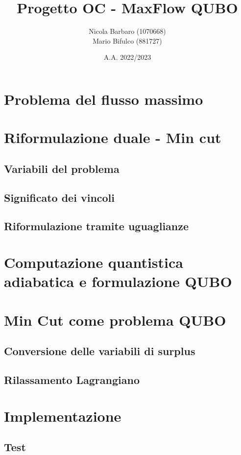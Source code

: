 \documentclass{article}
\author{Nicola Barbaro (1070668)\\Mario Bifulco (881727)}
\title{Progetto OC - MaxFlow QUBO}
\date{A.A. 2022/2023}
\begin{document}
\maketitle
\section{Problema del flusso massimo}
\section{Riformulazione duale - Min cut}
\subsection{Variabili del problema}
\subsection{Significato dei vincoli}
\subsection{Riformulazione tramite uguaglianze}
\section{Computazione quantistica adiabatica e formulazione QUBO}
\section{Min Cut come problema QUBO}
\subsection{Conversione delle variabili di surplus}
\subsection{Rilassamento Lagrangiano}
\section{Implementazione}
\subsection{Test}
\end{document}
